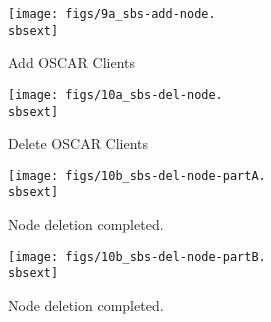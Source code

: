 
\begin{figure}[htbp]
  \begin{center}
    \texttt{[image: figs/9a\_sbs-add-node.\\sbsext]}
    \caption{Add OSCAR Clients}
    \label{fig:sbs-add-node1}
  \end{center}
\end{figure}




\begin{figure}[htbp]
  \begin{center}
    \texttt{[image: figs/10a\_sbs-del-node.\\sbsext]}
    \caption{Delete OSCAR Clients}
    \label{fig:sbs-del-node1}
  \end{center}
\end{figure}

\begin{figure}[htbp]
  \begin{center}
    \texttt{[image: figs/10b\_sbs-del-node-partA.\\sbsext]}
    \caption{Node deletion completed.}
    \label{fig:sbs-del-node1-done-partA}
  \end{center}
\end{figure}

\begin{figure}[htbp]
  \begin{center}
    \texttt{[image: figs/10b\_sbs-del-node-partB.\\sbsext]}
    \caption{Node deletion completed.}
    \label{fig:sbs-del-node1-done-partB}
  \end{center}
\end{figure}


\clearpage


